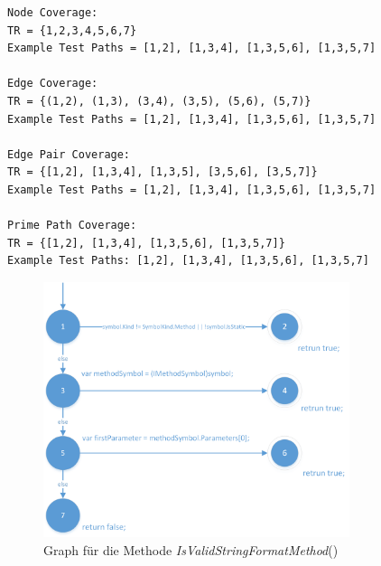 \begin{lstlisting}[caption={Coverage für die Mehtode \textit{IsValidStringFormatMethod}},
label=lst:coverage-IsValidStringFormatMethod]
Node Coverage:
TR = {1,2,3,4,5,6,7}
Example Test Paths = [1,2], [1,3,4], [1,3,5,6], [1,3,5,7]

Edge Coverage:
TR = {(1,2), (1,3), (3,4), (3,5), (5,6), (5,7)}
Example Test Paths = [1,2], [1,3,4], [1,3,5,6], [1,3,5,7]

Edge Pair Coverage:
TR = {[1,2], [1,3,4], [1,3,5], [3,5,6], [3,5,7]}
Example Test Paths = [1,2], [1,3,4], [1,3,5,6], [1,3,5,7]

Prime Path Coverage:
TR = {[1,2], [1,3,4], [1,3,5,6], [1,3,5,7]}
Example Test Paths: [1,2], [1,3,4], [1,3,5,6], [1,3,5,7]

\end{lstlisting}
\begin{figure}
	\centering
	\includegraphics[width=0.8\textwidth]{images/GraphISValidStringFormatMethod.png}
	\caption{Graph für die Methode \textit{IsValidStringFormatMethod}()}
	\label{fig:graph-validstring}
\end{figure}

